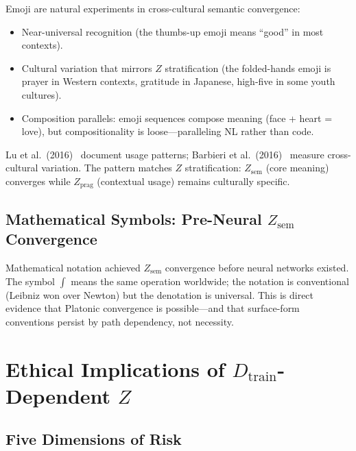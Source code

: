 \documentclass[11pt]{article}
\theoremstyle{definition}
\newcommand{\Zsem}{Z_{\text{sem}}}
\newcommand{\Zprag}{Z_{\text{prag}}}
\newcommand{\Dtrain}{D_{\text{train}}}
\begin{document}
Emoji are natural experiments in cross-cultural semantic convergence:
\begin{itemize}[nosep]
  \item Near-universal recognition (the thumbs-up emoji means ``good'' in most contexts).
  \item Cultural variation that mirrors $Z$ stratification (the folded-hands emoji is prayer in Western contexts, gratitude in Japanese, high-five in some youth cultures).
  \item Composition parallels: emoji sequences compose meaning (face + heart = love), but compositionality is loose---paralleling NL rather than code.
\end{itemize}

Lu et al.\ (2016)~\cite{lu2016emoji} document usage patterns; Barbieri et al.\ (2016)~\cite{barbieri2016emoji} measure cross-cultural variation. The pattern matches $Z$ stratification: $\Zsem$ (core meaning) converges while $\Zprag$ (contextual usage) remains culturally specific.

\subsection{Mathematical Symbols: Pre-Neural $\Zsem$ Convergence}

Mathematical notation achieved $\Zsem$ convergence before neural networks existed. The symbol $\int$ means the same operation worldwide; the notation is conventional (Leibniz won over Newton) but the denotation is universal. This is direct evidence that Platonic convergence is possible---and that surface-form conventions persist by path dependency, not necessity.

\section{Ethical Implications of $\Dtrain$-Dependent $Z$}\label{app:ethics}

\subsection{Five Dimensions of Risk}
\end{document}
